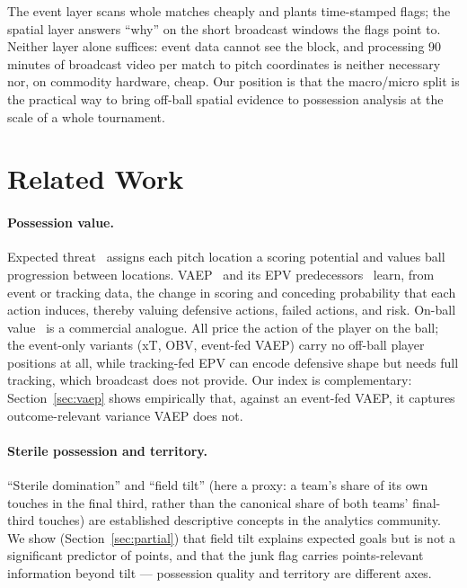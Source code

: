 \documentclass[11pt]{article}
\begin{document}
The event layer scans whole matches cheaply and plants time-stamped flags; the
spatial layer answers ``why'' on the short broadcast windows the flags point
to. Neither layer alone suffices: event data cannot see the block, and
processing 90 minutes of broadcast video per match to pitch coordinates is
neither necessary nor, on commodity hardware, cheap. Our position is that the
macro/micro split is the practical way to bring off-ball spatial evidence to
possession analysis at the scale of a whole tournament.

\section{Related Work}
\label{sec:related}

\paragraph{Possession value.} Expected threat~\citep{singh2019xt} assigns each
pitch location a scoring potential and values ball progression between
locations. VAEP~\citep{decroos2019actions} and its EPV
predecessors~\citep{fernandez2021epv} learn, from event or tracking data, the
change in scoring and conceding probability that each action induces, thereby
valuing defensive actions, failed actions, and risk. On-ball
value~\citep{statsbomb2021obv} is a commercial analogue. All price the action
of the player on the ball; the event-only variants (xT, OBV, event-fed VAEP)
carry no off-ball player positions at all, while tracking-fed EPV can encode
defensive shape but needs full tracking, which broadcast does not provide. Our
index is complementary: Section~\ref{sec:vaep} shows empirically that, against an
event-fed VAEP, it captures outcome-relevant variance VAEP does not.

\paragraph{Sterile possession and territory.} ``Sterile domination'' and
``field tilt'' (here a proxy: a team's share of its own touches in the final
third, rather than the canonical share of both teams' final-third touches) are
established descriptive concepts in the analytics community. We show (Section~\ref{sec:partial}) that
field tilt explains expected goals but is not a significant predictor of points,
and that the junk flag carries points-relevant information beyond tilt --- possession quality and
territory are different axes.
\end{document}
